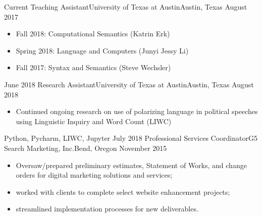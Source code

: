 %
%
%
\begin{experiences}
  \experience
    {Current}   {Teaching Assistant}{University of Texas at Austin}{Austin, Texas}
    {August 2017} {
                      \begin{itemize}
                        \item Fall 2018: Computational Semantics (Katrin Erk) 
                        \item Spring 2018: Language and Computers (Junyi Jessy Li)
                        \item Fall 2017: Syntax and Semantics (Steve Wechsler)
                      \end{itemize}
                    }{}
  \emptySeparator
  \experiencetech
    {June 2018} {Research Assistant}{University of Texas at Austin}{Austin, Texas}
    {August 2018}    {
                      \begin{itemize}
                        \item Continued ongoing research on use of polarizing language in political speeches using Linguistic Inquiry and Word Count (LIWC)                       
                      \end{itemize}
                    }
                    {Python, Pycharm, LIWC, Jupyter}
  \emptySeparator
  \experiencetech
    {July 2018}     {Professional Services Coordinator}{G5 Search Marketing, Inc.}{Bend, Oregon}
    {November 2015}    {
                      \begin{itemize}
                        \item Oversaw/prepared preliminary estimates, Statement of Works, and change orders for digital marketing solutions and services; 
                        \item worked with clients to  complete select website enhancement projects; 
                        \item streamlined implementation processes for new deliverables.


\end{itemize}}
\end{experiences}
